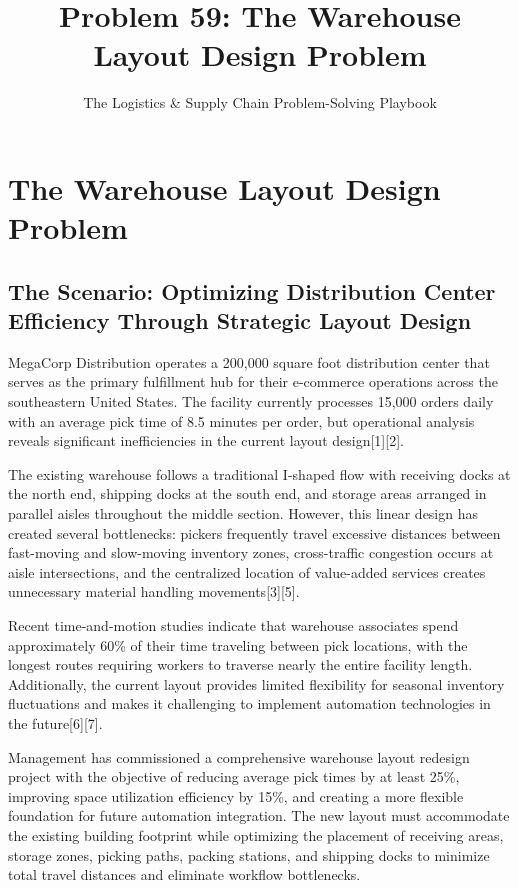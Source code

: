 \documentclass{article}
\title{Problem 59: The Warehouse Layout Design Problem}
\author{The Logistics \& Supply Chain Problem-Solving Playbook}
\date{}
\begin{document}
\maketitle

\section{The Warehouse Layout Design Problem}

\subsection{The Scenario: Optimizing Distribution Center Efficiency Through Strategic Layout Design}

MegaCorp Distribution operates a 200,000 square foot distribution center that serves as the primary fulfillment hub for their e-commerce operations across the southeastern United States. The facility currently processes 15,000 orders daily with an average pick time of 8.5 minutes per order, but operational analysis reveals significant inefficiencies in the current layout design[1][2].

The existing warehouse follows a traditional I-shaped flow with receiving docks at the north end, shipping docks at the south end, and storage areas arranged in parallel aisles throughout the middle section. However, this linear design has created several bottlenecks: pickers frequently travel excessive distances between fast-moving and slow-moving inventory zones, cross-traffic congestion occurs at aisle intersections, and the centralized location of value-added services creates unnecessary material handling movements[3][5].

Recent time-and-motion studies indicate that warehouse associates spend approximately 60\% of their time traveling between pick locations, with the longest routes requiring workers to traverse nearly the entire facility length. Additionally, the current layout provides limited flexibility for seasonal inventory fluctuations and makes it challenging to implement automation technologies in the future[6][7].

Management has commissioned a comprehensive warehouse layout redesign project with the objective of reducing average pick times by at least 25\%, improving space utilization efficiency by 15\%, and creating a more flexible foundation for future automation integration. The new layout must accommodate the existing building footprint while optimizing the placement of receiving areas, storage zones, picking paths, packing stations, and shipping docks to minimize total travel distances and eliminate workflow bottlenecks.
\end{document}

